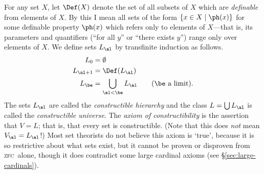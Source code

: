 \documentclass{amsart}
\def\zfc{\textsc{zfc}}
\begin{document}
\begin{eg}\label{thm:v=l}
  For any set $X$, let $\Def(X)$ denote the set of all subsets of $X$
  which are \emph{definable} from elements of $X$.  By this I mean all
  sets of the form $\{x\in X \mid \ph(x)\}$ for some definable
  property $\ph(x)$ which refers only to elements of $X$---that is,
  its parameters and quantifiers (``for all $y$'' or ``there exists
  $y$'') range only over elements of $X$.  We define sets $L_\al$ by
  transfinite induction as follows.
  \begin{align*}
    L_0 &= \emptyset\\
    L_{\al+1} &= \Def(L_\al)\\
    L_\be &= \bigcup_{\al<\be} L_\al \qquad\text{($\be$ a limit)}.
  \end{align*}
  The sets $L_\al$ are called the \emph{constructible hierarchy} and
  the class $L=\bigcup L_\al$ is called the \emph{constructible
    universe}.  The \emph{axiom of constructibility} is the assertion
  that $V=L$; that is, that every set is constructible.  (Note that
  this does \emph{not} mean $V_\al=L_\al$!)  Most set theorists do not
  believe this axiom is `true', because it is so restrictive about
  what sets exist, but it cannot be proven or disproven from \zfc\
  alone, though it does contradict some large cardinal axioms (see
  \S\ref{sec:large-cardinals}).
\end{eg}
\end{document}
